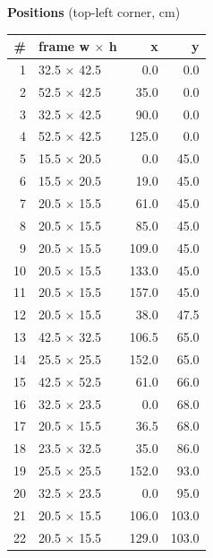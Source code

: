 \documentclass[a4paper,landscape,10pt]{article}
\begin{document}
\begin{minipage}[t]{0.25\textwidth}
\vspace{8pt}
{\bfseries Positions} (top-left corner, cm)\\[2pt]
\tiny
\begin{tabular}{@{}r l r r@{}}
\toprule
\# & frame w $\times$ h & x & y \\
\midrule
1 & 32.5 $\times$ 42.5 & 0.0 & 0.0 \\
2 & 52.5 $\times$ 42.5 & 35.0 & 0.0 \\
3 & 32.5 $\times$ 42.5 & 90.0 & 0.0 \\
4 & 52.5 $\times$ 42.5 & 125.0 & 0.0 \\
5 & 15.5 $\times$ 20.5 & 0.0 & 45.0 \\
6 & 15.5 $\times$ 20.5 & 19.0 & 45.0 \\
7 & 20.5 $\times$ 15.5 & 61.0 & 45.0 \\
8 & 20.5 $\times$ 15.5 & 85.0 & 45.0 \\
9 & 20.5 $\times$ 15.5 & 109.0 & 45.0 \\
10 & 20.5 $\times$ 15.5 & 133.0 & 45.0 \\
11 & 20.5 $\times$ 15.5 & 157.0 & 45.0 \\
12 & 20.5 $\times$ 15.5 & 38.0 & 47.5 \\
13 & 42.5 $\times$ 32.5 & 106.5 & 65.0 \\
14 & 25.5 $\times$ 25.5 & 152.0 & 65.0 \\
15 & 42.5 $\times$ 52.5 & 61.0 & 66.0 \\
16 & 32.5 $\times$ 23.5 & 0.0 & 68.0 \\
17 & 20.5 $\times$ 15.5 & 36.5 & 68.0 \\
18 & 23.5 $\times$ 32.5 & 35.0 & 86.0 \\
19 & 25.5 $\times$ 25.5 & 152.0 & 93.0 \\
20 & 32.5 $\times$ 23.5 & 0.0 & 95.0 \\
21 & 20.5 $\times$ 15.5 & 106.0 & 103.0 \\
22 & 20.5 $\times$ 15.5 & 129.0 & 103.0 \\
\bottomrule
\end{tabular}
\end{minipage}
\clearpage
\end{document}
